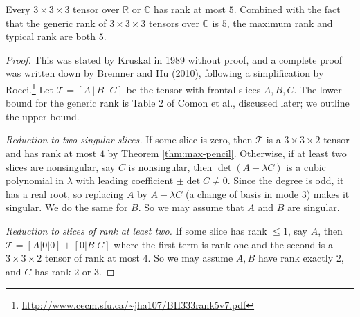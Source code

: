   \begin{theorem}[Kruskal]
    \label{thm:333}
    Every $3 \times 3 \times 3$ tensor over $\mathbb{R}$ or $\mathbb{C}$ has rank at most $5$. Combined with the fact that the generic rank of $3 \times 3 \times 3$ tensors over $\mathbb{C}$ is $5$, the maximum rank and typical rank are both $5$.
  \end{theorem}
  \begin{proof}
    This was stated by Kruskal in 1989 without proof, and a complete proof was written down by Bremner and Hu (2010), following a simplification by Rocci.\footnote{\url{http://www.cecm.sfu.ca/~jha107/BH333rank5v7.pdf}} Let $\mathcal{T} = [A \,|\, B \,|\, C]$ be the tensor with frontal slices $A, B, C$. The lower bound for the generic rank is Table 2 of Comon et al., discussed later; we outline the upper bound.

    \textit{Reduction to two singular slices.} If some slice is zero, then $\mathcal{T}$ is a $3 \times 3 \times 2$ tensor and has rank at most $4$ by Theorem \ref{thm:max-pencil}. Otherwise, if at least two slices are nonsingular, say $C$ is nonsingular, then $\det(A - \lambda C)$ is a cubic polynomial in $\lambda$ with leading coefficient $\pm \det C \neq 0$. Since the degree is odd, it has a real root, so replacing $A$ by $A - \lambda C$ (a change of basis in mode $3$) makes it singular. We do the same for $B$. So we may assume that $A$ and $B$ are singular.

    \textit{Reduction to slices of rank at least two.} If some slice has rank $\leq 1$, say $A$, then $\mathcal{T} = [A|0|0] + [0|B|C]$ where the first term is rank one and the second is a $3 \times 3 \times 2$ tensor of rank at most $4$. So we may assume $A, B$ have rank exactly $2$, and $C$ has rank $2$ or $3$.


\end{proof}
